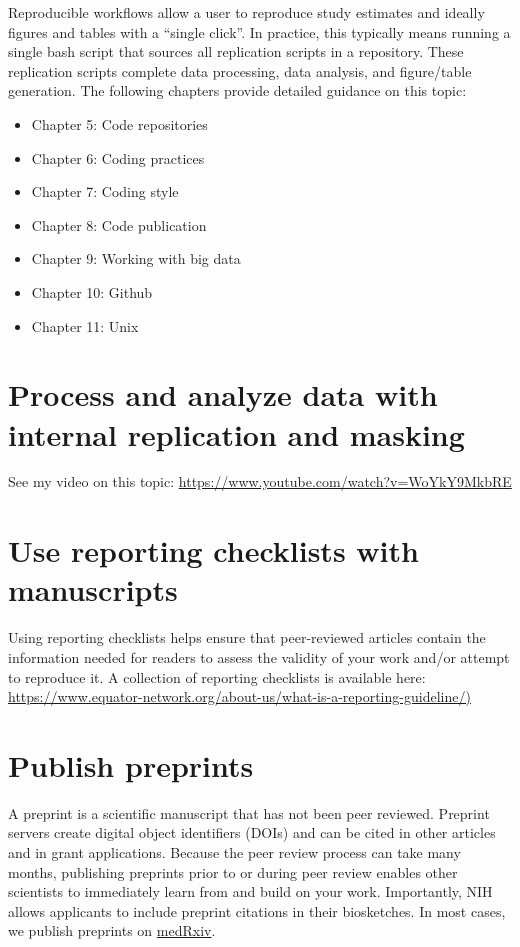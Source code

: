 \documentclass[
]{book}
\providecommand{\tightlist}{%
  \setlength{\itemsep}{0pt}\setlength{\parskip}{0pt}}
\begin{document}
Reproducible workflows allow a user to reproduce study estimates and ideally figures and tables with a ``single click''. In practice, this typically means running a single bash script that sources all replication scripts in a repository. These replication scripts complete data processing, data analysis, and figure/table generation. The following chapters provide detailed guidance on this topic:

\begin{itemize}
\tightlist
\item
  Chapter 5: Code repositories
\item
  Chapter 6: Coding practices
\item
  Chapter 7: Coding style
\item
  Chapter 8: Code publication
\item
  Chapter 9: Working with big data
\item
  Chapter 10: Github
\item
  Chapter 11: Unix
\end{itemize}

\section{Process and analyze data with internal replication and masking}\label{process-and-analyze-data-with-internal-replication-and-masking}

See my video on this topic: \url{https://www.youtube.com/watch?v=WoYkY9MkbRE}

\section{Use reporting checklists with manuscripts}\label{use-reporting-checklists-with-manuscripts}

Using reporting checklists helps ensure that peer-reviewed articles contain the information needed for readers to assess the validity of your work and/or attempt to reproduce it. A collection of reporting checklists is available here: \href{https://www.equator-network.org/about-us/what-is-a-reporting-guideline/}{https://www.equator-network.org/about-us/what-is-a-reporting-guideline/)}

\section{Publish preprints}\label{publish-preprints}

A preprint is a scientific manuscript that has not been peer reviewed. Preprint servers create digital object identifiers (DOIs) and can be cited in other articles and in grant applications. Because the peer review process can take many months, publishing preprints prior to or during peer review enables other scientists to immediately learn from and build on your work. Importantly, NIH allows applicants to include preprint citations in their biosketches. In most cases, we publish preprints on \href{https://www.medrxiv.org/}{medRxiv}.
\end{document}
